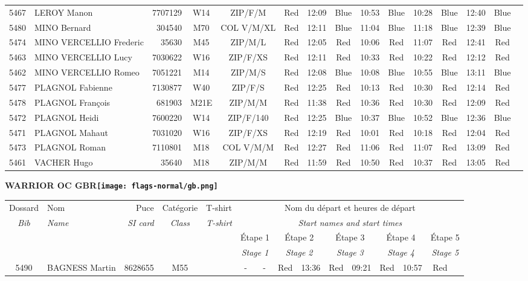\documentclass{report}
\begin{document}
\begin{longtable}{|c|l|r|c|c|*{5}{cc|}}
    5467 & LEROY Manon & 7707129 & W14 & ZIP/F/M & Red & 12:09 & Blue & 10:53 & Blue & 10:28 & Blue & 12:40 & Blue &  \\
    5480 & MINO Bernard & 304540 & M70 & COL V/M/XL & Red & 12:11 & Blue & 11:04 & Blue & 11:18 & Blue & 12:39 & Blue &  \\
    5474 & MINO VERCELLIO Frederic & 35630 & M45 & ZIP/M/L & Red & 12:05 & Red & 10:06 & Red & 11:07 & Red & 12:41 & Red &  \\
    5463 & MINO VERCELLIO Lucy & 7030622 & W16 & ZIP/F/XS & Red & 12:11 & Red & 10:33 & Red & 10:22 & Red & 12:12 & Red &  \\
    5462 & MINO VERCELLIO Romeo & 7051221 & M14 & ZIP/M/S & Red & 12:08 & Blue & 10:08 & Blue & 10:55 & Blue & 13:11 & Blue &  \\
    5477 & PLAGNOL Fabienne & 7130877 & W40 & ZIP/F/S & Red & 12:25 & Red & 10:13 & Red & 10:30 & Red & 12:14 & Red &  \\
    5478 & PLAGNOL François & 681903 & M21E & ZIP/M/M & Red & 11:38 & Red & 10:36 & Red & 10:30 & Red & 12:09 & Red &  \\
    5472 & PLAGNOL Heidi & 7600220 & W14 & ZIP/F/140 & Red & 12:25 & Blue & 10:37 & Blue & 10:52 & Blue & 12:36 & Blue &  \\
    5471 & PLAGNOL Mahaut & 7031020 & W16 & ZIP/F/XS & Red & 12:19 & Red & 10:01 & Red & 10:18 & Red & 12:04 & Red &  \\
    5473 & PLAGNOL Roman & 7110801 & M18 & COL V/M/M & Red & 12:27 & Red & 11:06 & Red & 11:07 & Red & 13:09 & Red &  \\
    5461 & VACHER Hugo & 35640 & M18 & ZIP/M/M & Red & 11:59 & Red & 10:50 & Red & 10:37 & Red & 13:05 & Red &  \\
  \end{longtable}
\newpage
  \Huge \centering \bfseries WARRIOR OC  GBR\normalfont \footnotesize \sffamily \hfill \texttt{[image: flags-normal/gb.png]} \newline 
  \begin{longtable}{|c|l|r|c|c|*{5}{cc|}}
    Dossard & Nom  & Puce    & Catégorie & T-shirt & \multicolumn{10}{c|}{Nom du départ et heures de départ} \\
    \itshape Bib     & \itshape Name & \itshape SI card & \itshape Class  & \itshape  T-shirt  & \multicolumn{10}{c|}{\itshape Start names and start times} \\
    \hline
    & & & & & \multicolumn{2}{c|}{Étape 1} & \multicolumn{2}{c|}{Étape 2} & \multicolumn{2}{c|}{Étape 3} & \multicolumn{2}{c|}{Étape 4} & \multicolumn{2}{c|}{Étape 5} \\
    & & & & & \multicolumn{2}{c|}{\itshape Stage 1} & \multicolumn{2}{c|}{\itshape Stage 2} & \multicolumn{2}{c|}{\itshape Stage 3} & \multicolumn{2}{c|}{\itshape Stage 4} & \multicolumn{2}{c|}{\itshape Stage 5} \\
    \hline
    5490 & BAGNESS Martin & 8628655 & M55 &   & - &  - & Red & 13:36 & Red & 09:21 & Red & 10:57 & Red &  \\
  \end{longtable}
\end{document}

